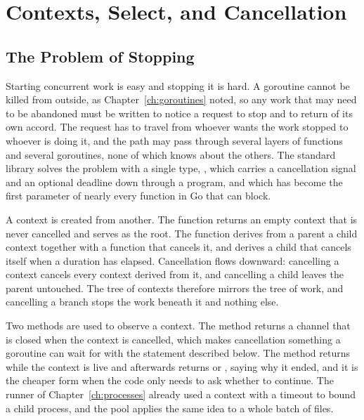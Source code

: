 \chapter{Contexts, Select, and Cancellation}
\label{ch:contexts}

\section{The Problem of Stopping}

Starting concurrent work is easy and stopping it is hard. A goroutine cannot be killed from outside, as Chapter~\ref{ch:goroutines} noted, so any work that may need to be abandoned must be written to notice a request to stop and to return of its own accord. The request has to travel from whoever wants the work stopped to whoever is doing it, and the path may pass through several layers of functions and several goroutines, none of which knows about the others. The standard library solves the problem with a single type, , which carries a cancellation signal and an optional deadline down through a program, and which has become the first parameter of nearly every function in Go that can block.

A context is created from another. The function  returns an empty context that is never cancelled and serves as the root. The function  derives from a parent a child context together with a function that cancels it, and  derives a child that cancels itself when a duration has elapsed. Cancellation flows downward: cancelling a context cancels every context derived from it, and cancelling a child leaves the parent untouched. The tree of contexts therefore mirrors the tree of work, and cancelling a branch stops the work beneath it and nothing else.

Two methods are used to observe a context. The method  returns a channel that is closed when the context is cancelled, which makes cancellation something a goroutine can wait for with the  statement described below. The method  returns  while the context is live and afterwards returns  or , saying why it ended, and it is the cheaper form when the code only needs to ask whether to continue. The runner of Chapter~\ref{ch:processes} already used a context with a timeout to bound a child process, and the pool applies the same idea to a whole batch of files.

